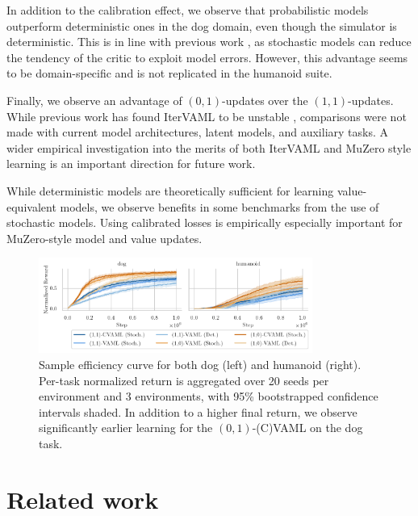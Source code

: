 In addition to the calibration effect, we observe that probabilistic models outperform deterministic ones in the dog domain, even though the simulator is deterministic.
This is in line with previous work \parencite{pets,mbpo}, as stochastic models can reduce the tendency of the critic to exploit model errors.
However, this advantage seems to be domain-specific and is not replicated in the humanoid suite.

Finally, we observe an advantage of $(0,1)$-updates over the $(1,1)$-updates.
While previous work has found IterVAML to be unstable \parencite{lovatto2020decision,voelcker2022value}, comparisons were not made with current model architectures, latent models, and auxiliary tasks.
A wider empirical investigation into the merits of both IterVAML and MuZero style learning is an important direction for future work.

\begin{boxinsight}
While deterministic models are theoretically sufficient for learning value-equivalent models, we observe benefits in some benchmarks from the use of stochastic models.
Using calibrated losses is empirically especially important for MuZero-style model and value updates.
\end{boxinsight}

\begin{figure}[t]
    \centering
    \includegraphics[width=0.8\textwidth]{figures/lambda/plts/reward.pdf} 
    \caption{Sample efficiency curve for both dog (left) and humanoid (right). Per-task normalized return is aggregated over 20 seeds per environment and 3 environments, with 95\% bootstrapped confidence intervals shaded. 
    In addition to a higher final return, we observe significantly earlier learning for the $(0,1)$-(C)VAML on the dog task.}
   \label{fig:cvaml:dmc_reward}
\end{figure}

\section{Related work}

